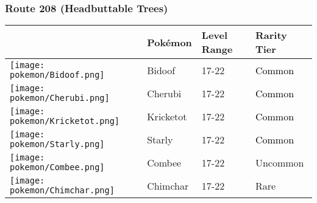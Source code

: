 \subsubsection{Route 208 (Headbuttable Trees)}%
\label{ssubsec:Route208(HeadbuttableTrees)}%
\begin{longtable}{||l l l l||}%
\hline%
\rowcolor{GroundColor}%
&Pokémon&Level Range&Rarity Tier\\%
\hline%
\endhead%
\hline%
\rowcolor{GroundColor}%
\texttt{[image: pokemon/Bidoof.png]}&Bidoof&17{-}22&\textcolor{black}{%
Common%
}\\%
\hline%
\rowcolor{GroundColor}%
\texttt{[image: pokemon/Cherubi.png]}&Cherubi&17{-}22&\textcolor{black}{%
Common%
}\\%
\hline%
\rowcolor{GroundColor}%
\texttt{[image: pokemon/Kricketot.png]}&Kricketot&17{-}22&\textcolor{black}{%
Common%
}\\%
\hline%
\rowcolor{GroundColor}%
\texttt{[image: pokemon/Starly.png]}&Starly&17{-}22&\textcolor{black}{%
Common%
}\\%
\hline%
\rowcolor{GroundColor}%
\texttt{[image: pokemon/Combee.png]}&Combee&17{-}22&\textcolor{OliveGreen}{%
Uncommon%
}\\%
\hline%
\rowcolor{GroundColor}%
\texttt{[image: pokemon/Chimchar.png]}&Chimchar&17{-}22&\textcolor{RedOrange}{%
Rare%
}\\%
\hline%
\end{longtable}%
\caption{Wild Pokémon in Route 208 (Headbuttable Trees)}